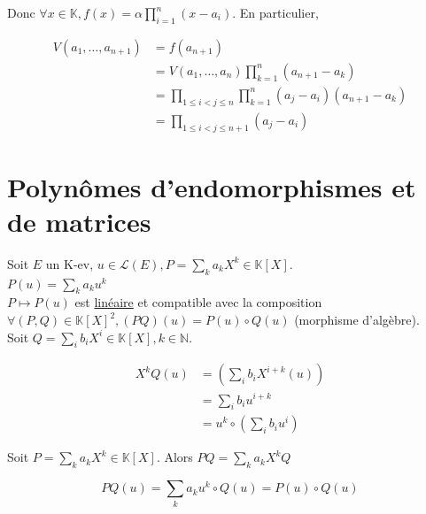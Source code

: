 \documentclass[]{article}
\begin{document}
\begin{itemize}
\begin{itemize}
        Donc $\forall x \in \mathbb{K}, f(x) = \alpha \prod_{i=1}^{n}(x-a_i)$. En particulier, 

        \begin{align*}
            V(a_1, \dots, a_{n+1}) &= f(a_{n+1}) \\
            &= V(a_1, \dots, a_n) \prod_{k=1}^{n}(a_{n+1}-a_k) \\
            &= \prod_{1 \leq i < j \leq n} \prod_{k=1}^{n} (a_j - a_i) (a_{n+1}-a_k) \\ 
            &= \prod_{1 \leq i < j \leq n+1} (a_j - a_i)
        \end{align*} 
    \end{itemize}
\end{itemize}

\section{Polynômes d'endomorphismes et de matrices}

Soit $E$ un K-ev, $u \in \mathcal{L}(E), P = \sum_{k} a_k X^k \in \mathbb{K}[X]$. \\

\underline{$P(u) = \sum_{k} a_k u^k$} \\

$P \mapsto P(u)$ est \underline{linéaire} et compatible avec la composition \underline{$\forall (P, Q) \in \mathbb{K}[X]^2, (PQ)(u) = P(u) \circ Q(u)$} (morphisme d'algèbre). \\

Soit $Q = \sum_{i} b_i X^i \in \mathbb{K}[X], k \in \mathbb{N}$.

\begin{align*}
    X^kQ(u) &= (\sum_{i} b_i X^{i+k}(u)) \\
    &= \sum_{i} b_i u^{i+k} \\
    &= u^k \circ (\sum_{i} b_i u^i)
\end{align*}

Soit $P = \sum_{k} a_k X^k \in \mathbb{K}[X]$. Alors $PQ = \sum_{k} a_k X^kQ$

\[ PQ(u) = \sum_{k}a_k u^k \circ Q(u) = P(u) \circ Q(u) \]
\end{document}
